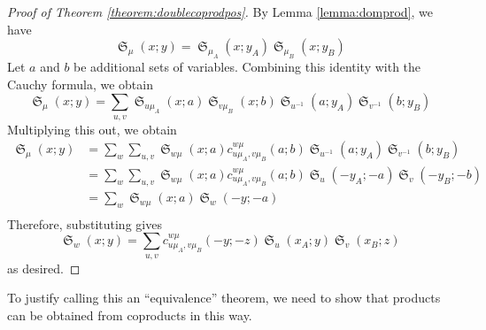\documentclass{amsart}
\newtheorem{corollary}[lemma]{Corollary}
\theoremstyle{definition}
\theoremstyle{remark}
\numberwithin{equation}{subsection}
\DeclareMathOperator{\sch}{\mathfrak{S}}
\begin{document}
\begin{proof}[Proof of Theorem \ref{theorem:doublecoprodpos}]
By Lemma \ref{lemma:domprod}, we have
$$\sch_\mu(x;y)=\sch_{\mu_A}(x;y_A)\sch_{\mu_B}(x;y_B)$$
Let $a$ and $b$ be additional sets of variables. Combining this identity with the Cauchy formula, we obtain
$$\sch_\mu(x;y)=\sum_{u,v}\sch_{u\mu_A}(x;a)\sch_{v\mu_B}(x;b)\sch_{u^{-1}}(a;y_A)\sch_{v^{-1}}(b;y_B)$$
Multiplying this out, we obtain
\begin{align*}
\sch_\mu(x;y)&=\sum_w\sum_{u,v}\sch_{w\mu}(x;a)c_{u\mu_A,v\mu_B}^{w\mu}(a;b)\sch_{u^{-1}}(a;y_A)\sch_{v^{-1}}(b;y_B)\\
             &=\sum_w\sum_{u,v}\sch_{w\mu}(x;a)c_{u\mu_A,v\mu_B}^{w\mu}(a;b)\sch_{u}(-y_A;-a)\sch_{v}(-y_B;-b)\\
						 &=\sum_w\sch_{w\mu}(x;a)\sch_{w}(-y;-a)\\
\end{align*}
Therefore, substituting gives
$$\sch_w(x;y)=\sum_{u,v}c_{u\mu_A,v\mu_B}^{w\mu}(-y;-z)\sch_u(x_A;y)\sch_v(x_B;z)$$
as desired.
\end{proof}




To justify calling this an ``equivalence'' theorem, we need to show that products can be obtained from coproducts in this way.
\end{document}

